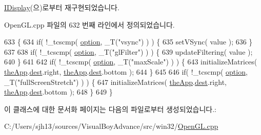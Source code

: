 \mbox{\hyperlink{class_i_display_a1766244708c252bb8781892c76c20ba9}{I\+Display}}(으)로부터 재구현되었습니다.



Open\+G\+L.\+cpp 파일의 632 번째 라인에서 정의되었습니다.


\begin{DoxyCode}
633 \{
634     \textcolor{keywordflow}{if}( !\_tcscmp( \mbox{\hyperlink{structoption}{option}}, \_T(\textcolor{stringliteral}{"vsync"}) ) ) \{
635         setVSync( value );
636     \}
637 
638     \textcolor{keywordflow}{if}( !\_tcscmp( \mbox{\hyperlink{structoption}{option}}, \_T(\textcolor{stringliteral}{"glFilter"}) ) ) \{
639         updateFiltering( value );
640     \}
641 
642     \textcolor{keywordflow}{if}( !\_tcscmp( \mbox{\hyperlink{structoption}{option}}, \_T(\textcolor{stringliteral}{"maxScale"}) ) ) \{
643         initializeMatrices( \mbox{\hyperlink{_v_b_a_8cpp_a8095a9d06b37a7efe3723f3218ad8fb3}{theApp}}.\mbox{\hyperlink{class_v_b_a_aed77fc82f818810cc87c470768c75e05}{dest}}.right, \mbox{\hyperlink{_v_b_a_8cpp_a8095a9d06b37a7efe3723f3218ad8fb3}{theApp}}.\mbox{\hyperlink{class_v_b_a_aed77fc82f818810cc87c470768c75e05}{dest}}.bottom );
644     \}
645 
646     \textcolor{keywordflow}{if}( !\_tcscmp( \mbox{\hyperlink{structoption}{option}}, \_T(\textcolor{stringliteral}{"fullScreenStretch"}) ) ) \{
647         initializeMatrices( \mbox{\hyperlink{_v_b_a_8cpp_a8095a9d06b37a7efe3723f3218ad8fb3}{theApp}}.\mbox{\hyperlink{class_v_b_a_aed77fc82f818810cc87c470768c75e05}{dest}}.right, \mbox{\hyperlink{_v_b_a_8cpp_a8095a9d06b37a7efe3723f3218ad8fb3}{theApp}}.\mbox{\hyperlink{class_v_b_a_aed77fc82f818810cc87c470768c75e05}{dest}}.bottom );
648     \}
649 \}
\end{DoxyCode}


이 클래스에 대한 문서화 페이지는 다음의 파일로부터 생성되었습니다.\+:\begin{DoxyCompactItemize}
\item 
C\+:/\+Users/sjh13/sources/\+Visual\+Boy\+Advance/src/win32/\mbox{\hyperlink{_open_g_l_8cpp}{Open\+G\+L.\+cpp}}\end{DoxyCompactItemize}

